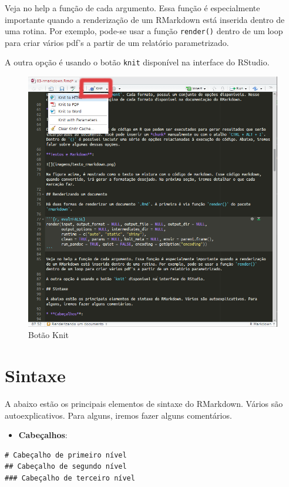 \documentclass[]{book}
\providecommand{\tightlist}{%
  \setlength{\itemsep}{0pt}\setlength{\parskip}{0pt}}
\begin{document}
Veja no help a função de cada argumento. Essa função é especialmente
importante quando a renderização de um RMarkdown está inserida dentro de
uma rotina. Por exemplo, pode-se usar a função \texttt{render()} dentro
de um loop para criar vários pdf's a partir de um relatório
parametrizado.

A outra opção é usando o botão \texttt{knit} disponível na interface do
RStudio.

\begin{figure}
\centering
\includegraphics{images/knit_button.png}
\caption{Botão Knit}
\end{figure}

\section{Sintaxe}\label{sintaxe}

A abaixo estão os principais elementos de sintaxe do RMarkdown. Vários
são autoexplicativos. Para alguns, iremos fazer alguns comentários.

\begin{itemize}
\tightlist
\item
  \textbf{Cabeçalhos}:
\end{itemize}

\begin{verbatim}
# Cabeçalho de primeiro nível
## Cabeçalho de segundo nível
### Cabeçalho de terceiro nível
\end{verbatim}
\end{document}
